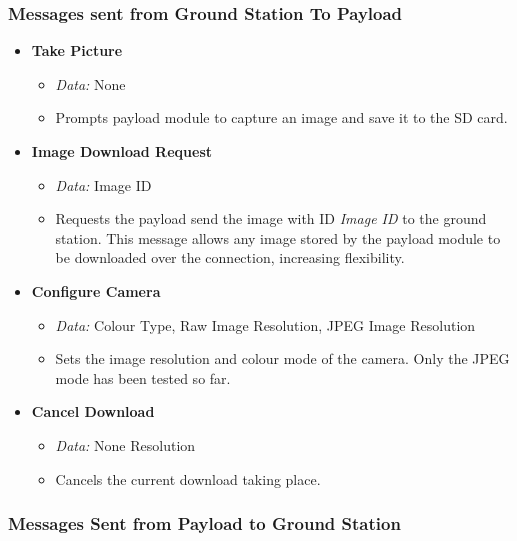 \subsubsection*{Messages sent from Ground Station To Payload}

\begin{itemize}
\item \textbf{Take Picture}
\begin{itemize}
\item \emph{Data:} None
\item Prompts payload module to capture an image and save it to the SD card.
\end{itemize}

\item \textbf{Image Download Request} 
\begin{itemize}

\item \emph{Data:} Image ID
\item Requests the payload send the image with ID \emph{Image ID} to the 
ground station. This message allows any image stored by the payload module 
to be downloaded over the connection, increasing flexibility. 
\end{itemize}

\item \textbf{Configure Camera}
\begin{itemize}
\item \emph{Data:} Colour Type, Raw Image Resolution, JPEG Image
Resolution
\item Sets the image resolution and colour mode of the camera. Only the 
JPEG mode has been tested so far.
\end{itemize}

\item \textbf{Cancel Download}
\begin{itemize}
\item \emph{Data:} None
Resolution
\item Cancels the current download taking place.
\end{itemize}

\end{itemize}

\subsubsection*{Messages Sent from Payload to Ground Station}

